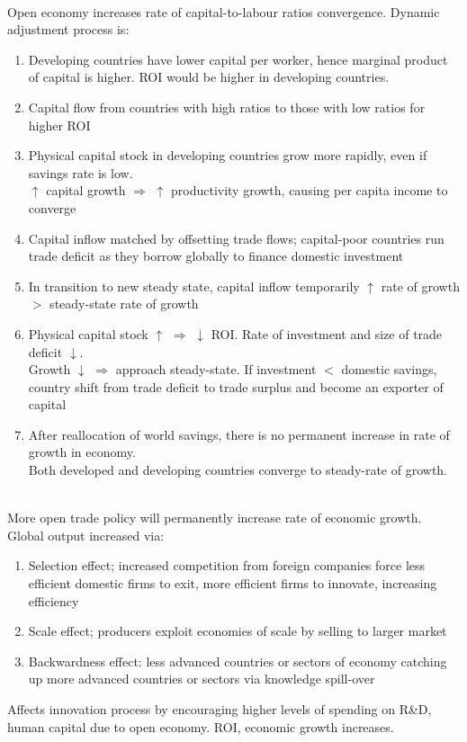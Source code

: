 \begin{remark} \\
Open economy increases rate of capital-to-labour ratios convergence. Dynamic adjustment process is:
\begin{enumerate}[label=\roman*.]
\setlength{\itemsep}{0pt}
\item Developing countries have lower capital per worker, hence marginal product of capital is higher. ROI would be higher in developing countries.
\item Capital flow from countries with high ratios to those with low ratios for higher ROI
\item Physical capital stock in developing countries grow more rapidly, even if savings rate is low.\\
$\uparrow$ capital growth $\Rightarrow$ $\uparrow$ productivity growth, causing per capita income to converge
\item Capital inflow matched by offsetting trade flows; capital-poor countries run trade deficit as they borrow globally to finance domestic investment
\item In transition to new steady state, capital inflow temporarily $\uparrow$ rate of growth $>$ steady-state rate of growth
\item Physical capital stock $\uparrow$ $\Rightarrow$ $\downarrow$ ROI. Rate of investment and size of trade deficit $\downarrow$.\\
Growth $\downarrow$ $\Rightarrow$ approach steady-state. If investment $<$ domestic savings, country shift from trade deficit to trade surplus and become an exporter of capital
\item  After reallocation of world savings, there is no permanent increase in rate of growth in economy.\\
Both developed and developing countries converge to steady-rate of growth.
\end{enumerate}
\end{remark}

\begin{remark} \\
More open trade policy will permanently increase rate of economic growth. Global output increased via:
\begin{enumerate}[label=\roman*.]
\setlength{\itemsep}{0pt}
\item Selection effect; increased competition from foreign companies force less efficient domestic firms to exit, more efficient firms to innovate, increasing efficiency
\item Scale effect; producers exploit economies of scale by selling to larger market
\item Backwardness effect: less advanced countries or sectors of economy catching up more advanced countries or sectors via knowledge spill-over
\end{enumerate}
Affects innovation process by encouraging higher levels of spending on R\&D, human capital due to open economy. ROI, economic growth increases.
\end{remark}

